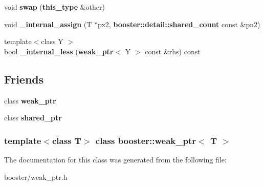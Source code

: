 \begin{DoxyCompactItemize}
\item 
void {\bfseries swap} ({\bf this\-\_\-type} \&other)\label{classbooster_1_1weak__ptr_aeb4c669b4fec5e924788445ebc24c6a8}

\item 
void {\bfseries \-\_\-internal\-\_\-assign} (\-T $\ast$px2, {\bf booster\-::detail\-::shared\-\_\-count} const \&pn2)\label{classbooster_1_1weak__ptr_a25735d2007d3d902fecbbc62baa5f68d}

\item 
{\footnotesize template$<$class Y $>$ }\\bool {\bfseries \-\_\-internal\-\_\-less} ({\bf weak\-\_\-ptr}$<$ \-Y $>$ const \&rhs) const \label{classbooster_1_1weak__ptr_add37bcc06d008e84a977813a11932249}

\end{DoxyCompactItemize}
\subsection*{\-Friends}
\begin{DoxyCompactItemize}
\item 
class {\bfseries weak\-\_\-ptr}\label{classbooster_1_1weak__ptr_a73fb185cab8b7bb5f231491bb497071c}

\item 
class {\bfseries shared\-\_\-ptr}\label{classbooster_1_1weak__ptr_a9a4da829475f0cf1809fc6ef555ffe06}

\end{DoxyCompactItemize}
\subsubsection*{template$<$class \-T$>$ class booster\-::weak\-\_\-ptr$<$ T $>$}



\-The documentation for this class was generated from the following file\-:\begin{DoxyCompactItemize}
\item 
booster/weak\-\_\-ptr.\-h\end{DoxyCompactItemize}
